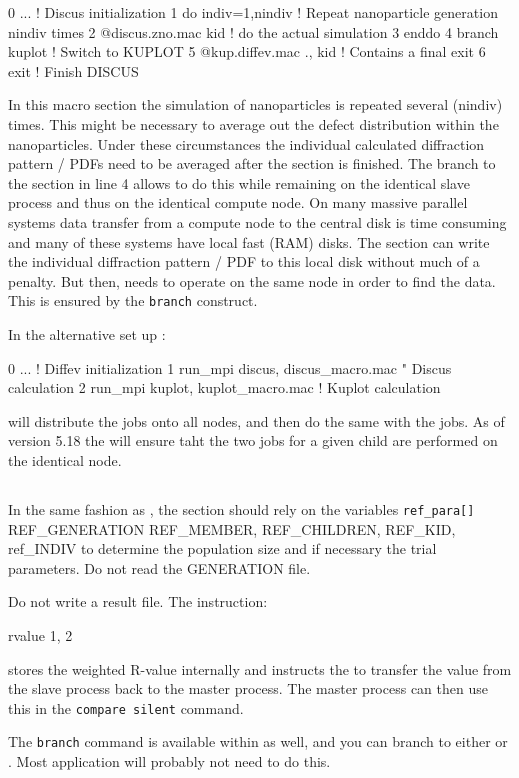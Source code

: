 \begin{MacVerbatim}
0   ...                        ! Discus initialization
1   do indiv=1,nindiv          ! Repeat nanoparticle generation nindiv times
2      @discus.zno.mac kid     ! do the actual simulation
3   enddo
4   branch   kuplot            ! Switch to KUPLOT
5      @kup.diffev.mac ., kid  ! Contains a final exit
6   exit                       ! Finish DISCUS
\end{MacVerbatim}

In this \Discus macro section the simulation of nanoparticles is repeated
several (nindiv) times. This might be necessary to average out the defect
distribution within the nanoparticles. Under these circumstances the individual
calculated diffraction pattern / PDFs need to be averaged after the \Discus 
section is finished. The branch to the \Kuplot section in line 4 allows
\Discus to do this while remaining on the identical slave process and thus 
on the identical compute node. On many massive parallel systems data transfer 
from a compute node to the central disk is time consuming and many of these 
systems have local fast (RAM) disks. The \Discus section can write the 
individual diffraction pattern / PDF to this local disk without much of a
penalty. But then, \Kuplot needs to operate on the same node in order to 
find the data. This is ensured by the {\tt branch} construct. 

In the alternative set up :
\begin{MacVerbatim}
0   ...                         ! Diffev initialization
1   run\_mpi discus, discus\_macro.mac  " Discus calculation
2   run\_mpi kuplot, kuplot\_macro.mac  ! Kuplot calculation
\end{MacVerbatim}

\Diffev will distribute the \Discus jobs onto all nodes, and then do 
the same with the \Kuplot jobs. As of version 5.18 the \Suite will ensure
taht 
the two jobs for a given child are performed on the identical node. 

\subsection{\kuplot}

In the same fashion as \Discus, the \Kuplot section should rely 
on the variables {\tt ref\_para[]}
REF\_GENERATION REF\_MEMBER, REF\_CHILDREN, REF\_KID, ref\_INDIV 
to determine the population size and if necessary the 
trial parameters. Do not read the GENERATION file.

Do not write a result file. The \Kuplot instruction:
\begin{MacVerbatim}
rvalue 1, 2
\end{MacVerbatim}

stores the weighted R-value internally and instructs the \Suite to
transfer the value from the slave process back to the master process.
The master process can then use this in the {\tt compare silent} command.

The {\tt branch} command is available within \Kuplot as well, and you
can branch to either \Diffev or \Discus. Most application will probably 
not need to do this.
